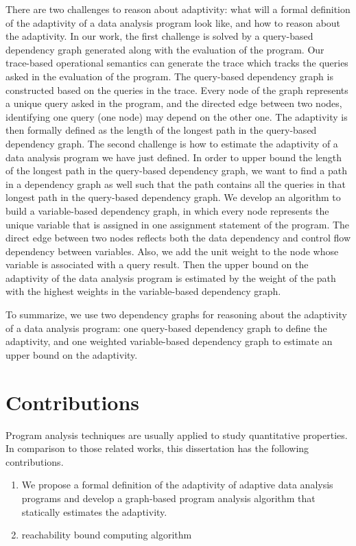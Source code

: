 {There are two challenges to reason about adaptivity: what will a formal definition of the adaptivity of a data analysis program look like, and how to reason about the adaptivity. 
In our work, the first challenge is solved by a query-based dependency graph generated along with the evaluation of the program. 
Our trace-based operational semantics can generate the trace which tracks the queries asked in the evaluation of the program. 
The query-based dependency graph is constructed based on the queries in the trace. Every node of the graph represents a unique query asked in the program, and the directed edge between two nodes, identifying one query (one node) may depend on the other one. 
The adaptivity is then formally defined as the length of the longest path in the query-based dependency graph.}
{The second challenge is how to estimate the adaptivity of a data analysis program we have just defined. 
In order to upper bound the length of the longest path in the query-based dependency graph, we want to find a path in a dependency graph as well such that the path contains all the queries in that longest path in the query-based dependency graph. 
We develop an algorithm to build a variable-based dependency graph, in which every node represents the unique variable that is assigned in one assignment statement of the program. 
The direct edge between two nodes reflects both the data dependency and control flow dependency between variables. Also, we add the unit weight to the node whose variable is associated with a query result. Then the upper bound on the adaptivity of the data analysis program is estimated by the weight of the path with the highest weights in the variable-based dependency graph.}

{To summarize, we use two dependency graphs for reasoning about the adaptivity of a data analysis program: 
one query-based dependency graph to define the adaptivity, and one weighted variable-based dependency graph to estimate an upper bound on the adaptivity. }

\section{Contributions}

Program analysis techniques are usually applied to study quantitative properties. In comparison to those related works, this dissertation has the following contributions.

\begin{enumerate}

\item We propose a formal definition of the adaptivity of adaptive data analysis programs and develop a graph-based program analysis algorithm that statically estimates the adaptivity.
\item reachability bound computing algorithm
\end{enumerate}

